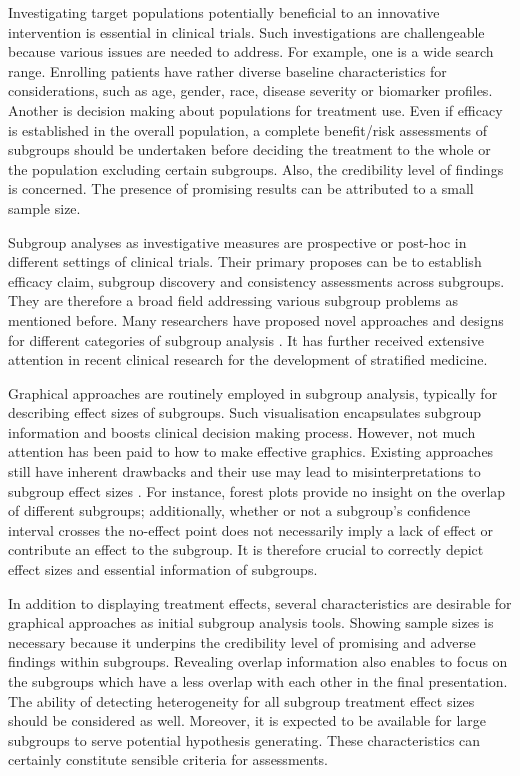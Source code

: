 \documentclass[Afour,sagev,times, doublespace]{sagej}
\begin{document}
Investigating target populations potentially beneficial to an innovative intervention is essential in clinical trials. Such investigations are challengeable because various issues are needed to address. For example, one is a wide search range. Enrolling patients have rather diverse baseline characteristics for considerations, such as age, gender, race, disease severity or biomarker profiles. Another is decision making about populations for treatment use. Even if efficacy is established in the overall population, a complete benefit/risk assessments of subgroups should be undertaken before deciding the treatment to the whole or the population excluding certain subgroups. Also, the credibility level of findings is concerned. The presence of promising results can be attributed to a small sample size.

 Subgroup analyses as investigative measures are prospective or post-hoc in different settings of clinical trials. Their primary proposes can be to establish efficacy claim, subgroup discovery and consistency assessments across subgroups. They are therefore a broad field addressing various subgroup problems as mentioned before. Many researchers have proposed novel approaches and designs for different categories of subgroup analysis \cite{Alosh:16, Ondra:16, Dmitrienko:16}. It has further received extensive attention in recent clinical research for the development of stratified medicine.

Graphical approaches are routinely employed in subgroup analysis, typically for describing effect sizes of subgroups. Such visualisation encapsulates subgroup information and boosts clinical decision making process. However, not much attention has been paid to how to make effective graphics. Existing approaches still have inherent drawbacks and their use may lead to misinterpretations to subgroup effect sizes \cite{Alosh:16}. For instance, forest plots provide no insight on the overlap of different subgroups; additionally, whether or not a subgroup’s confidence interval crosses the no-effect point does not necessarily imply a lack of effect or contribute an effect to the subgroup. It is therefore crucial to correctly depict effect sizes and essential information of subgroups.

In addition to displaying treatment effects, several characteristics are desirable for graphical approaches as initial subgroup analysis tools. Showing sample sizes is necessary because it underpins the credibility level of promising and adverse findings within subgroups. Revealing overlap information also enables to focus on the subgroups which have a less overlap with each other in the final presentation. The ability of detecting heterogeneity for all subgroup treatment effect sizes should be considered as well. Moreover, it is expected to be available for large subgroups to serve potential hypothesis generating. These characteristics can certainly constitute sensible criteria for assessments.
\end{document}
